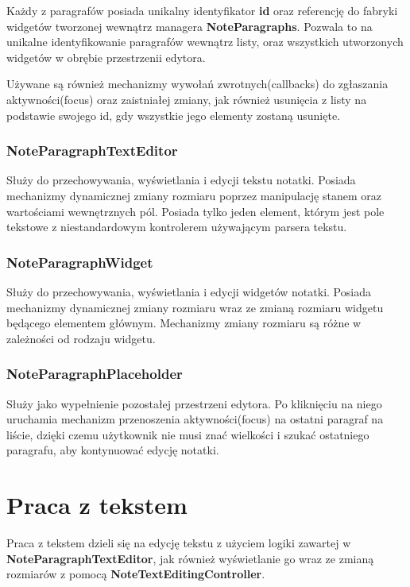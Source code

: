 Każdy z paragrafów posiada unikalny identyfikator \textbf{id} oraz referencję do fabryki widgetów tworzonej wewnątrz managera \textbf{NoteParagraphs}.
Pozwala to na unikalne identyfikowanie paragrafów wewnątrz listy, oraz wszystkich utworzonych widgetów w obrębie przestrzenii edytora.

Używane są również mechanizmy wywołań zwrotnych(callbacks) do zgłaszania aktywności(focus) oraz zaistniałej zmiany, jak również usunięcia z listy na podstawie swojego id, gdy wszystkie jego elementy zostaną usunięte.

\subsubsection{NoteParagraphTextEditor}

Służy do przechowywania, wyświetlania i edycji tekstu notatki. Posiada mechanizmy dynamicznej zmiany rozmiaru poprzez manipulację stanem oraz wartościami wewnętrznych pól. Posiada tylko jeden element, którym jest pole tekstowe z niestandardowym kontrolerem używającym parsera tekstu.

\subsubsection{NoteParagraphWidget}

Służy do przechowywania, wyświetlania i edycji widgetów notatki. Posiada mechanizmy dynamicznej zmiany rozmiaru wraz ze zmianą rozmiaru widgetu będącego elementem głównym. Mechanizmy zmiany rozmiaru są różne w zależności od rodzaju widgetu.

\subsubsection{NoteParagraphPlaceholder}

Służy jako wypełnienie pozostałej przestrzeni edytora. Po kliknięciu na niego uruchamia mechanizm przenoszenia aktywności(focus) na ostatni paragraf na liście, dzięki czemu użytkownik nie musi znać wielkości i szukać ostatniego paragrafu, aby kontynuować edycję notatki.

\section{Praca z tekstem}

Praca z tekstem dzieli się na edycję tekstu z użyciem logiki zawartej w \textbf{NoteParagraphTextEditor}, jak również wyświetlanie go wraz ze zmianą rozmiarów z pomocą \textbf{NoteTextEditingController}.

